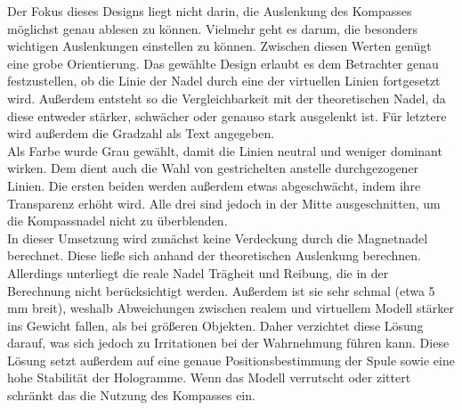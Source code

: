 Der Fokus dieses Designs liegt nicht darin, die Auslenkung des Kompasses möglichst genau ablesen zu können. Vielmehr geht es darum, die besonders wichtigen Auslenkungen einstellen zu können. Zwischen diesen Werten genügt eine grobe Orientierung. Das gewählte Design erlaubt es dem Betrachter genau festzustellen, ob die Linie der Nadel durch eine der virtuellen Linien fortgesetzt wird. Außerdem entsteht so die Vergleichbarkeit mit der theoretischen Nadel, da diese entweder stärker, schwächer oder genauso stark ausgelenkt ist. Für letztere wird außerdem die Gradzahl als Text angegeben.\\
\noindent\hspace*{5mm}
Als Farbe wurde Grau gewählt, damit die Linien neutral und weniger dominant wirken. Dem dient auch die Wahl von gestrichelten anstelle durchgezogener Linien. Die ersten beiden werden außerdem etwas abgeschwächt, indem ihre Transparenz erhöht wird. Alle drei sind jedoch in der Mitte ausgeschnitten, um die Kompassnadel nicht zu überblenden.\\

In dieser Umsetzung wird zunächst keine Verdeckung durch die Magnetnadel berechnet. Diese ließe sich anhand der theoretischen Auslenkung berechnen. Allerdings unterliegt die reale Nadel Trägheit und Reibung, die in der Berechnung nicht berücksichtigt werden. Außerdem ist sie sehr schmal (etwa 5 mm breit), weshalb Abweichungen zwischen realem und virtuellem Modell stärker ins Gewicht fallen, als bei größeren Objekten. Daher verzichtet diese Lösung darauf, was sich jedoch zu Irritationen bei der Wahrnehmung führen kann. Diese Lösung setzt außerdem auf eine genaue Positionsbestimmung der Spule sowie eine hohe Stabilität der Hologramme. Wenn das Modell verrutscht oder zittert schränkt das die Nutzung des Kompasses ein.

\vspace{8px}
\begin{center}
	\\
\end{center}
\vspace{6px}


